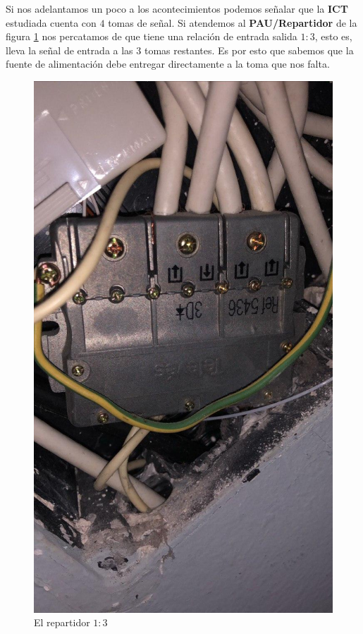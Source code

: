 \documentclass{article}[12 pt]
\begin{document}
			Si nos adelantamos un poco a los acontecimientos podemos señalar que la \textbf{ICT} estudiada cuenta con $4$ tomas de señal. Si atendemos al \textbf{PAU/Repartidor} de la figura \ref{f:pau} nos percatamos de que tiene una relación de entrada salida $1:3$, esto es, lleva la señal de entrada a las $3$ tomas restantes. Es por esto que sabemos que la fuente de alimentación debe entregar directamente a la toma que nos falta.\\

			\begin{figure}
				\centering
				\includegraphics[scale=0.2, angle=-90]{repartidor.jpg}
				\caption{El repartidor $1:3$}
				\label{f:pau}
			\end{figure}
\end{document}
